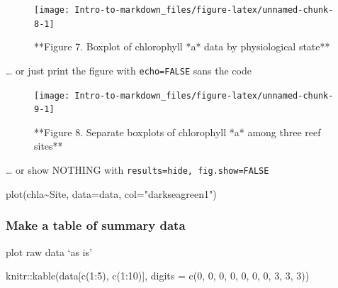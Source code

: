 \documentclass[
]{article}
\newenvironment{Shaded}{\begin{snugshade}}{\end{snugshade}}
\newcommand{\AttributeTok}[1]{\textcolor[rgb]{0.77,0.63,0.00}{#1}}
\newcommand{\DecValTok}[1]{\textcolor[rgb]{0.00,0.00,0.81}{#1}}
\newcommand{\FunctionTok}[1]{\textcolor[rgb]{0.00,0.00,0.00}{#1}}
\newcommand{\NormalTok}[1]{#1}
\newcommand{\SpecialCharTok}[1]{\textcolor[rgb]{0.00,0.00,0.00}{#1}}
\newcommand{\StringTok}[1]{\textcolor[rgb]{0.31,0.60,0.02}{#1}}
\begin{document}
\begin{figure}

{\centering \texttt{[image: Intro-to-markdown\_files/figure-latex/unnamed-chunk-8-1]} 

}

\caption{**Figure 7. Boxplot of chlorophyll *a* data by physiological state**}\label{fig:unnamed-chunk-8}
\end{figure}

\ldots{} or just print the figure with \texttt{echo=FALSE} sans the code

\begin{figure}

{\centering \texttt{[image: Intro-to-markdown\_files/figure-latex/unnamed-chunk-9-1]} 

}

\caption{**Figure 8. Separate boxplots of chlorophyll *a* among three reef sites**}\label{fig:unnamed-chunk-9}
\end{figure}

\ldots{} or show NOTHING with
\texttt{results=\textquotesingle{}hide\textquotesingle{},\ fig.show=FALSE}

\begin{Shaded}
\begin{Highlighting}[]
\FunctionTok{plot}\NormalTok{(chla}\SpecialCharTok{\textasciitilde{}}\NormalTok{Site, }\AttributeTok{data=}\NormalTok{data, }\AttributeTok{col=}\StringTok{"darkseagreen1"}\NormalTok{)}
\end{Highlighting}
\end{Shaded}

\hypertarget{make-a-table-of-summary-data}{%
\subsubsection{Make a table of summary
data}\label{make-a-table-of-summary-data}}

plot raw data `as is'

\begin{Shaded}
\begin{Highlighting}[]
\NormalTok{knitr}\SpecialCharTok{::}\FunctionTok{kable}\NormalTok{(data[}\FunctionTok{c}\NormalTok{(}\DecValTok{1}\SpecialCharTok{:}\DecValTok{5}\NormalTok{), }\FunctionTok{c}\NormalTok{(}\DecValTok{1}\SpecialCharTok{:}\DecValTok{10}\NormalTok{)], }\AttributeTok{digits =} \FunctionTok{c}\NormalTok{(}\DecValTok{0}\NormalTok{, }\DecValTok{0}\NormalTok{, }\DecValTok{0}\NormalTok{, }\DecValTok{0}\NormalTok{, }\DecValTok{0}\NormalTok{, }\DecValTok{0}\NormalTok{, }\DecValTok{0}\NormalTok{, }\DecValTok{3}\NormalTok{, }\DecValTok{3}\NormalTok{, }\DecValTok{3}\NormalTok{))}
\end{Highlighting}
\end{Shaded}
\end{document}
